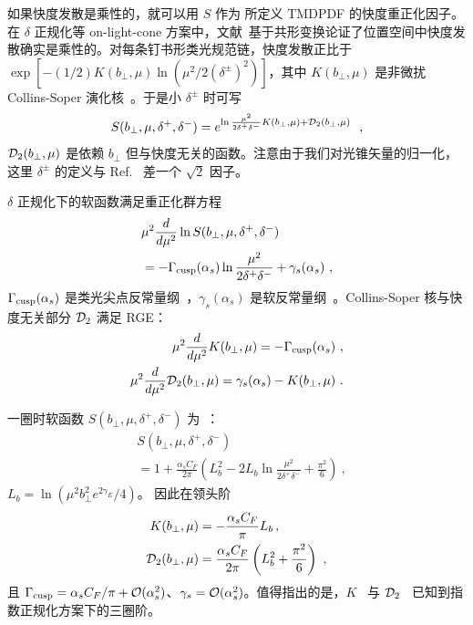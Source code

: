 如果快度发散是乘性的，就可以用 $S$ 作为  所定义 TMDPDF 的快度重正化因子。在 $\delta$ 正规化等 on-light-cone 方案中，文献~\cite{Vladimirov:2017ksc}基于共形变换论证了位置空间中快度发散确实是乘性的。对每条钉书形类光规范链，快度发散正比于 $\exp\left[-(1/2)K(b_\perp,\mu)\ln \left(\mu^2/2(\delta^{\pm})^2\right)\right]$，其中 $K(b_\perp,\mu)$ 是非微扰 Collins-Soper 演化核~\cite{Collins:1981uk}。于是小 $\delta^{\pm}$ 时可写
\begin{equation}
	S(b_\perp,\mu,\delta^+,\delta^-)=e^{\ln \frac{\mu^2}{2\delta^+\delta^-}K(b_\perp,\mu)+{\cal D}_2(b_\perp,\mu)} \ \ ,
\end{equation}
${\cal D}_2(b_\perp,\mu)$ 是依赖 $b_\perp$ 但与快度无关的函数。注意由于我们对光锥矢量的归一化，这里 $\delta^{\pm}$ 的定义与 Ref.~\cite{Echevarria:2015byo} 差一个 $\sqrt{2}$ 因子。

$\delta$ 正规化下的软函数满足重正化群方程
\begin{align}
	&\mu^2\frac{d}{d\mu^2}\ln S(b_\perp,\mu,\delta^+,\delta^-)\nonumber \\
	&=-\Gamma_{\rm cusp}(\alpha_s)\ln \frac{\mu^2}{2\delta^+\delta^-} + \gamma_s(\alpha_s)\ ,
\end{align}
$\Gamma_{\rm cusp}(\alpha_s) $ 是类光尖点反常量纲~\cite{Polyakov:1980ca,Korchemsky:1987wg}，$\gamma_s(\alpha_s)$ 是软反常量纲~\cite{Korchemskaya:1992je}。Collins-Soper 核与快度无关部分 ${\cal D}_2$ 满足 RGE：
\begin{align}
	\mu^2\frac{d}{d\mu^2} K(b_\perp,\mu)=-\Gamma_{\rm cusp}(\alpha_s) \label{eq:cusp}\ ,\\
	\mu^2\frac{d}{d\mu^2} {\cal D}_2(b_\perp,\mu)=\gamma_s(\alpha_s)-K(b_\perp,\mu) \label{eq:ad_d2}\ .
\end{align}

一圈时软函数 $S(b_\perp,\mu,\delta^+,\delta^-)$ 为~\cite{Echevarria:2012js}：
\begin{align}
	&S(b_\perp,\mu,\delta^+,\delta^-)\nonumber \\ &=1+\frac{\alpha_s C_F}{2\pi}\left(L_b^2-2L_b \ln \frac{\mu^2}{2\delta^+\delta^-}+\frac{\pi^2}{6}\right) \ ,
\end{align}
$L_b=\ln\left(\mu^2 b_\perp^2e^{2\gamma_E}/4\right)$。
因此在领头阶
\begin{align}
	K(b_\perp,\mu)&=-\frac{\alpha_sC_F}{\pi} L_b  \,,\\
	{\cal D}_2(b_\perp,\mu)&=\frac{\alpha_s C_F}{2\pi}\left(L_b^2+\frac{\pi^2}{6}\right) \ ,
\end{align}
且 $\Gamma_{\rm cusp}=\alpha_s C_F/\pi +{\cal O}(\alpha_s^2)$、$\gamma_s={\cal O}(\alpha_s^2)$。值得指出的是，$K$~\cite{Li:2016ctv,Vladimirov:2016dll} 与 ${\cal D}_2$~\cite{Li:2016ctv} 已知到指数正规化方案下的三圈阶。

